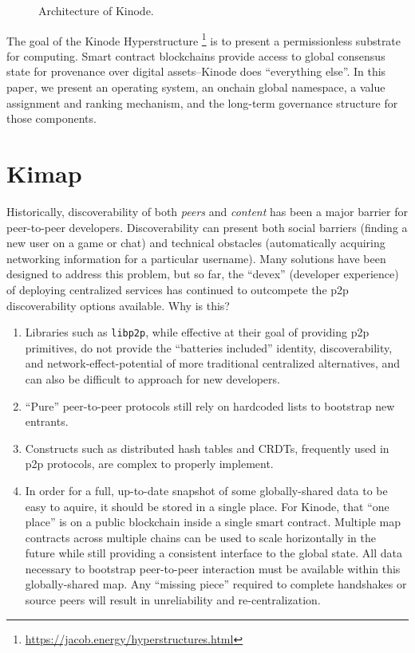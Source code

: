 \documentclass[runningheads]{llncs}
\begin{document}
\begin{figure}[H]
    \centering
    \caption{Architecture of Kinode.}
    \label{fig:triangle}
\end{figure}

The goal of the Kinode Hyperstructure
\footnote{\url{https://jacob.energy/hyperstructures.html}}
is to present a permissionless substrate for computing.
Smart contract blockchains provide access to global consensus state for provenance over digital assets–Kinode does ``everything else''.
In this paper, we present an operating system, an onchain global namespace, a value assignment and ranking mechanism, and the long-term governance structure for those components.

\section{Kimap}
\label{sec:kimap}

Historically, discoverability of both \textit{peers} and \textit{content} has been a major barrier for peer-to-peer developers.
Discoverability can present both social barriers (finding a new user on a game or chat) and technical obstacles (automatically acquiring networking information for a particular username).
Many solutions have been designed to address this problem, but so far, the ``devex'' (developer experience) of deploying centralized services has continued to outcompete the p2p discoverability options available.
Why is this?
\begin{enumerate}
    \item Libraries such as \verb|libp2p|, while effective at their goal of providing p2p primitives, do not provide the ``batteries included'' identity, discoverability, and network-effect-potential of more traditional centralized alternatives, and can also be difficult to approach for new developers.
    \item ``Pure'' peer-to-peer protocols still rely on hardcoded lists to bootstrap new entrants.
    \item Constructs such as distributed hash tables and CRDTs, frequently used in p2p protocols, are complex to properly implement.
    \item In order for a full, up-to-date snapshot of some globally-shared data to be easy to aquire, it should be stored in a single place.
    \subitem For Kinode, that ``one place'' is on a public blockchain inside a single smart contract.
    \subitem Multiple map contracts across multiple chains can be used to scale horizontally in the future while still providing a consistent interface to the global state.
    \subitem All data necessary to bootstrap peer-to-peer interaction must be available within this globally-shared map.
    \subitem Any ``missing piece'' required to complete handshakes or source peers will result in unreliability and re-centralization.
\end{enumerate}
\end{document}
